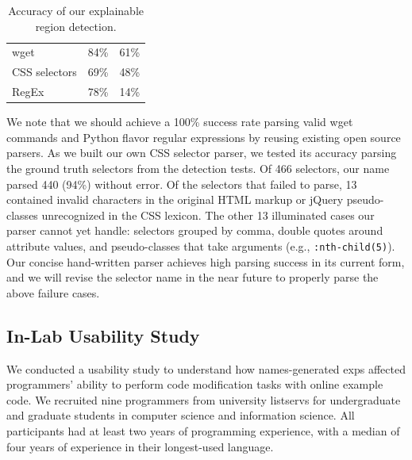 \begin{changes}
\begin{table}
\caption{Accuracy of our explainable region detection.}
\label{tab:detection_accuracy}
\centering
\begin{tabular}{llc}
\toprule
\headrow{Language} & \headrow{Precision} & \headrow{Recall} \\
\midrule
wget & 84\% & 61\% \\ \midrule
CSS selectors & 69\% & 48\% \\ \midrule
RegEx & 78\% & 14\% \\ \bottomrule
\end{tabular}
\end{table}
\fi

We note that we should achieve a 100\% success rate parsing valid wget commands and Python flavor regular expressions by reusing existing open source parsers.
As we built our own CSS selector parser, we tested its accuracy parsing the ground truth selectors from the detection tests.
Of 466 selectors, our \Gls{name} parsed 440 (94\%) without error.
Of the selectors that failed to parse, 13 contained invalid characters in the original HTML markup or jQuery pseudo-classes unrecognized in the CSS lexicon.
The other 13 illuminated cases our parser cannot yet handle: selectors grouped by comma, double quotes around attribute values, and pseudo-classes that take arguments (e.g., \texttt{:nth-child(5)}).
Our concise hand-written parser achieves high parsing success in its current form, and we will revise the selector \Gls{name} in the near future to properly parse the above failure cases.

\end{changes}

\subsection{In-Lab Usability Study}

We conducted a usability study to understand how \Glspl{name}-generated \glspl{exp} affected programmers' ability to perform code modification tasks with online example code.
We recruited nine programmers from university listservs for undergraduate and graduate students in computer science and information science.
All participants had at least two years of programming experience, with a median of four years of experience in their longest-used language.

